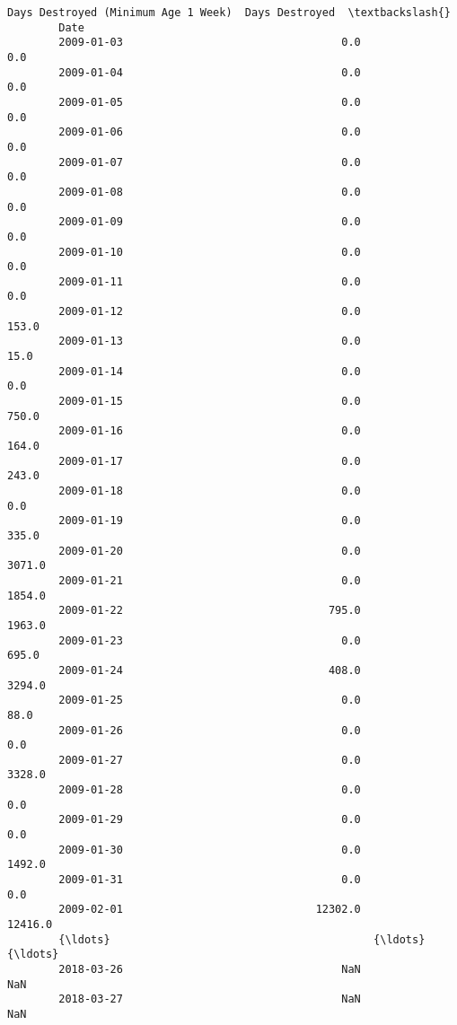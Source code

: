 \documentclass[11pt]{article}
\begin{document}
\begin{Verbatim}[commandchars=\\\{\}]
                    Days Destroyed (Minimum Age 1 Week)  Days Destroyed  \textbackslash{}
        Date                                                              
        2009-01-03                                  0.0             0.0   
        2009-01-04                                  0.0             0.0   
        2009-01-05                                  0.0             0.0   
        2009-01-06                                  0.0             0.0   
        2009-01-07                                  0.0             0.0   
        2009-01-08                                  0.0             0.0   
        2009-01-09                                  0.0             0.0   
        2009-01-10                                  0.0             0.0   
        2009-01-11                                  0.0             0.0   
        2009-01-12                                  0.0           153.0   
        2009-01-13                                  0.0            15.0   
        2009-01-14                                  0.0             0.0   
        2009-01-15                                  0.0           750.0   
        2009-01-16                                  0.0           164.0   
        2009-01-17                                  0.0           243.0   
        2009-01-18                                  0.0             0.0   
        2009-01-19                                  0.0           335.0   
        2009-01-20                                  0.0          3071.0   
        2009-01-21                                  0.0          1854.0   
        2009-01-22                                795.0          1963.0   
        2009-01-23                                  0.0           695.0   
        2009-01-24                                408.0          3294.0   
        2009-01-25                                  0.0            88.0   
        2009-01-26                                  0.0             0.0   
        2009-01-27                                  0.0          3328.0   
        2009-01-28                                  0.0             0.0   
        2009-01-29                                  0.0             0.0   
        2009-01-30                                  0.0          1492.0   
        2009-01-31                                  0.0             0.0   
        2009-02-01                              12302.0         12416.0   
        {\ldots}                                         {\ldots}             {\ldots}   
        2018-03-26                                  NaN             NaN   
        2018-03-27                                  NaN             NaN   

\end{Verbatim}
\end{document}
